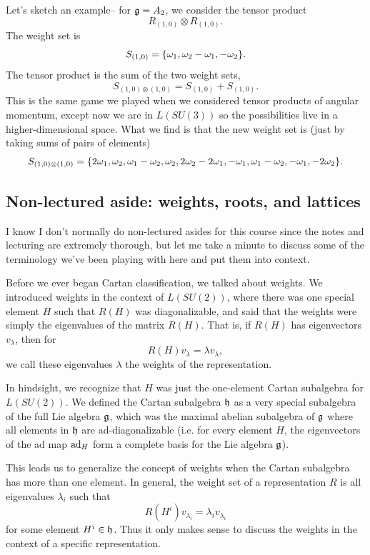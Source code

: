 \begin{exm}
Let's sketch an example-- for $\mathfrak{g}=A_2$, we consider the tensor product
$$R_{(1,0)}\otimes R_{(1,0)}.$$
The weight set is
$$S_{(1,0)}=\{\omega_1,\omega_2-\omega_1,-\omega_2\}.$$
The tensor product is the sum of the two weight sets,
$$S_{(1,0)\otimes (1,0)}=S_{(1,0)}+S_{(1,0)}.$$
This is the same game we played when we considered tensor products of angular momentum, except now we are in $L(SU(3))$ so the possibilities live in a higher-dimensional space. What we find is that the new weight set is (just by taking sums of pairs of elements)
$$S_{(1,0)\otimes (1,0)}=\{2\omega_1,\omega_2,\omega_1-\omega_2,\omega_2,2\omega_2-2\omega_1,-\omega_1,\omega_1-\omega_2,-\omega_1,-2\omega_2\}.$$
\end{exm}

\subsection*{Non-lectured aside: weights, roots, and lattices} I know I don't normally do non-lectured asides for this course since the notes and lecturing are extremely thorough, but let me take a minute to discuss some of the terminology we've been playing with here and put them into context.

Before we ever began Cartan classification, we talked about weights. We introduced weights in the context of $L(SU(2))$, where there was one special element $H$ such that $R(H)$ was diagonalizable, and said that the weights were simply the eigenvalues of the matrix $R(H)$. That is, if $R(H)$ has eigenvectors $v_\lambda$, then for
$$R(H)v_\lambda =\lambda v_\lambda,$$
we call these eigenvalues $\lambda$ the weights of the representation.

In hindsight, we recognize that $H$ was just the one-element Cartan subalgebra for $L(SU(2)).$ We defined the Cartan subalgebra $\mathfrak{h}$ as a very special subalgebra of the full Lie algebra $\mathfrak{g}$, which was the maximal abelian subalgebra of $\mathfrak{g}$ where all elements in $\mathfrak{h}$ are ad-diagonalizable (i.e. for every element $H$, the eigenvectors of the ad map $\operatorname{ad}_H$ form a complete basis for the Lie algebra $\mathfrak{g}$).

This leads us to generalize the concept of weights when the Cartan subalgebra has more than one element. In general, the weight set of a representation $R$ is all eigenvalues $\lambda_i$ such that
$$R(H^i)v_{\lambda_i}=\lambda_i v_{\lambda_i}$$ for some element $H^i\in \mathfrak{h}$. Thus it only makes sense to discuss the weights in the context of a specific representation.

